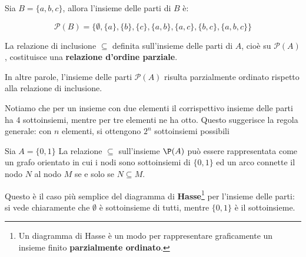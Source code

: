 \begin{esempio}
Sia $B = \{a, b, c\}$, allora l'insieme delle parti di $B$ è:

\[
\mathcal{P}(B) = \{ \emptyset, \{a\}, \{b\}, \{c\}, \{a, b\}, \{a, c\}, \{b, c\}, \{a, b, c\} \}
\]



\noindent La relazione di inclusione $\subseteq$ definita sull’insieme delle parti di $A$, cioè su $\mathcal{P}(A)$, costituisce una \textbf{relazione d'ordine parziale}. 

In altre parole, l'insieme delle parti $\mathcal{P}(A)$ risulta parzialmente ordinato rispetto alla relazione di inclusione.
\end{esempio} 

Notiamo che per un insieme con due elementi il corrispettivo insieme delle parti ha 4 sottoinsiemi, mentre per tre elementi ne ha otto. Questo suggerisce la regola generale: con $n$ elementi, si ottengono \(2^n\) sottoinsiemi possibili

\begin{esempio}
  Sia $A = \{0,1\}$ La relazione $\subseteq$ sull'insieme $\P(A)$ può essere rappresentata come un grafo orientato in cui i nodi sono sottoinsiemi di $\{0,1\}$ ed un arco connette il nodo $N$ al nodo $M$ se e solo se $N \subseteq M$.

\begin{center}
\end{center}

Questo è il caso più semplice del diagramma di \textbf{Hasse}\footnote{Un diagramma di Hasse è un modo per rappresentare graficamente un insieme finito \textbf{parzialmente ordinato}.} per l'insieme delle parti: si vede chiaramente  che \(\emptyset\) è sottoinsieme di tutti, mentre \(\{0,1\}\) è  il  sottoinsieme.
\end{esempio}


